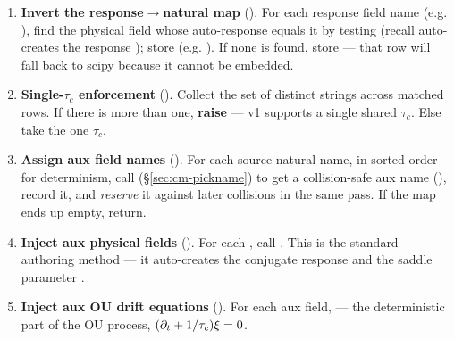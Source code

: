 \begin{enumerate}
  \item \textbf{Invert the response$\to$natural map}
        (). For each response
        field name  (e.g. ), find the physical field whose
        auto-response equals it by testing  (recall
         auto-creates the response ); store
         (e.g. ). If none is
        found, store  --- that row will fall back to scipy because it
        cannot be embedded.

  \item \textbf{Single-$\tau_c$ enforcement}
        (). Collect the set of
        distinct  strings across matched rows. If there is more
        than one, \textbf{raise } --- v1 supports a
        single shared $\tau_c$. Else take the one $\tau_c$.

  \item \textbf{Assign aux field names}
        (). For each source
        natural name, in sorted order for determinism, call
         (\S\ref{sec:cm-pickname}) to get a
        collision-safe aux name (), record it, and \emph{reserve} it
        against later collisions in the same pass. If the map ends up empty,
        return.

  \item \textbf{Inject aux physical fields}
        (). For each
        , call
        .
        This is the standard authoring method --- it auto-creates the conjugate
        response  and the saddle parameter
        .

  \item \textbf{Inject aux OU drift equations}
        (). For each aux field,
         --- the deterministic part of the OU process,
        $(\partial_t + 1/\tau_c)\xi = 0$.


\end{enumerate}
